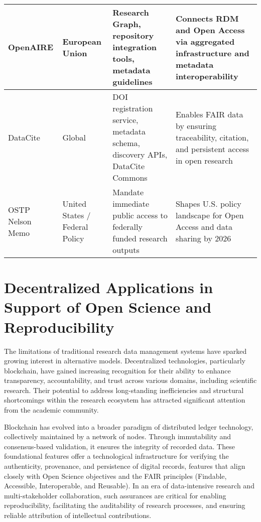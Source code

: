 \documentclass{article}
\begin{document}
\begin{table}[H]
{\begin{tabular}{|p{3.5cm}|p{4cm}|p{5cm}|p{5cm}|}
            OpenAIRE                           & European Union                              & Research Graph, repository integration tools, metadata guidelines           & Connects RDM and Open Access via aggregated infrastructure and metadata interoperability     \\
            \hline
            DataCite                           & Global                                      & DOI registration service, metadata schema, discovery APIs, DataCite Commons & Enables FAIR data by ensuring traceability, citation, and persistent access in open research \\
            \hline
            OSTP Nelson Memo                   & United States / Federal Policy              & Mandate immediate public access to federally funded research outputs        & Shapes U.S. policy landscape for Open Access and data sharing by 2026                        \\
            \hline
        \end{tabular}%
    }
\end{table}


\section*{Decentralized Applications in Support of Open Science and Reproducibility}

The limitations of traditional research data management systems have sparked growing interest in alternative models. Decentralized technologies, particularly blockchain, have gained increasing recognition for their ability to enhance transparency, accountability, and trust across various domains, including scientific research. Their potential to address long-standing inefficiencies and structural shortcomings within the research ecosystem has attracted significant attention from the academic community.

Blockchain has evolved into a broader paradigm of distributed ledger technology, collectively maintained by a network of nodes. Through immutability and consensus-based validation, it ensures the integrity of recorded data. These foundational features offer a technological infrastructure for verifying the authenticity, provenance, and persistence of digital records, features that align closely with Open Science objectives and the FAIR principles (Findable, Accessible, Interoperable, and Reusable). In an era of data-intensive research and multi-stakeholder collaboration, such assurances are critical for enabling reproducibility, facilitating the auditability of research processes, and ensuring reliable attribution of intellectual contributions.
\end{document}
